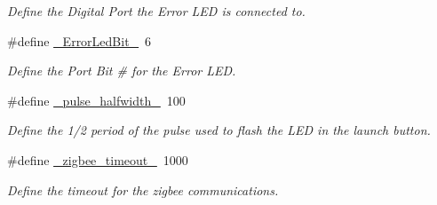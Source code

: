 \begin{DoxyCompactItemize}
\begin{DoxyCompactList}\small\item\em \-Define the \-Digital \-Port the \-Error \-L\-E\-D is connected to. \end{DoxyCompactList}\item 
\#define \hyperlink{remotePanel_8ino_a5504a284db73f254a1d5871844f6987c}{\-\_\-\-Error\-Led\-Bit\-\_\-}~6
\begin{DoxyCompactList}\small\item\em \-Define the \-Port \-Bit \# for the \-Error \-L\-E\-D. \end{DoxyCompactList}\item 
\#define \hyperlink{remotePanel_8ino_a9a8dc8e6e75e845a90d783b02b6be855}{\-\_\-pulse\-\_\-halfwidth\-\_\-}~100
\begin{DoxyCompactList}\small\item\em \-Define the 1/2 period of the pulse used to flash the \-L\-E\-D in the launch button. \end{DoxyCompactList}\item 
\#define \hyperlink{remotePanel_8ino_a6b982ea9a4c912acbfd98bbd5072e258}{\-\_\-zigbee\-\_\-timeout\-\_\-}~1000
\begin{DoxyCompactList}\small\item\em \-Define the timeout for the zigbee communications. \end{DoxyCompactList}\end{DoxyCompactItemize}

